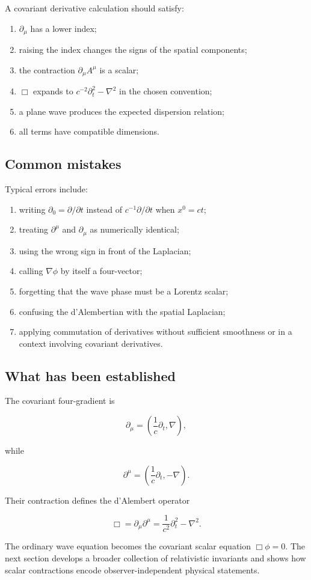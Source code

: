 A covariant derivative calculation should satisfy:

\begin{enumerate}
    \item \(\partial_{\mu}\) has a lower index;
    \item raising the index changes the signs of the spatial components;
    \item the contraction \(\partial_{\mu}A^{\mu}\) is a scalar;
    \item \(\Box\) expands to \(c^{-2}\partial_{t}^{2}-\nabla^{2}\) in the chosen convention;
    \item a plane wave produces the expected dispersion relation;
    \item all terms have compatible dimensions.
\end{enumerate}

\subsection{Common mistakes}

Typical errors include:

\begin{enumerate}
    \item writing \(\partial_{0}=\partial/\partial t\) instead of \(c^{-1}\partial/\partial t\) when \(x^{0}=ct\);
    \item treating \(\partial^{\mu}\) and \(\partial_{\mu}\) as numerically identical;
    \item using the wrong sign in front of the Laplacian;
    \item calling \(\nabla\phi\) by itself a four-vector;
    \item forgetting that the wave phase must be a Lorentz scalar;
    \item confusing the d'Alembertian with the spatial Laplacian;
    \item applying commutation of derivatives without sufficient smoothness or in a context involving covariant derivatives.
\end{enumerate}

\subsection{What has been established}

The covariant four-gradient is

\[
\partial_{\mu}
=
\left(
\frac{1}{c}\partial_{t},
\nabla
\right),
\]

while

\[
\partial^{\mu}
=
\left(
\frac{1}{c}\partial_{t},
-\nabla
\right).
\]

Their contraction defines the d'Alembert operator

\[
\Box
=
\partial_{\mu}\partial^{\mu}
=
\frac{1}{c^{2}}\partial_{t}^{2}
-
\nabla^{2}.
\]

The ordinary wave equation becomes the covariant scalar equation \(\Box\phi=0\). The next section develops a broader collection of relativistic invariants and shows how scalar contractions encode observer-independent physical statements.